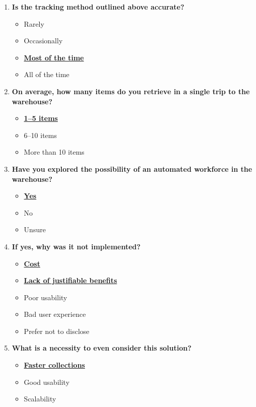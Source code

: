 \begin{enumerate}
    \newpage

    \item \textbf{Is the tracking method outlined above accurate?}
    \begin{itemize}
        \item Rarely
        \item Occasionally
        \item \textbf{\underline{Most of the time}}
        \item All of the time
    \end{itemize}

    \item \textbf{On average, how many items do you retrieve in a single trip to the warehouse?}
    \begin{itemize}
        \item \textbf{\underline{1–5 items}}
        \item 6–10 items
        \item More than 10 items
    \end{itemize}

    \item \textbf{Have you explored the possibility of an automated workforce in the warehouse?}
    \begin{itemize}
        \item \textbf{\underline{Yes}}
        \item No
        \item Unsure
    \end{itemize}

    \item \textbf{If yes, why was it not implemented?}
    \begin{itemize}
        \item \textbf{\underline{Cost}}
        \item \textbf{\underline{Lack of justifiable benefits}}
        \item Poor usability
        \item Bad user experience
        \item Prefer not to disclose
    \end{itemize}

    \item \textbf{What is a necessity to even consider this solution?}
    \begin{itemize}
        \item \textbf{\underline{Faster collections}}
        \item Good usability
        \item Scalability
    \end{itemize}
\end{enumerate}

